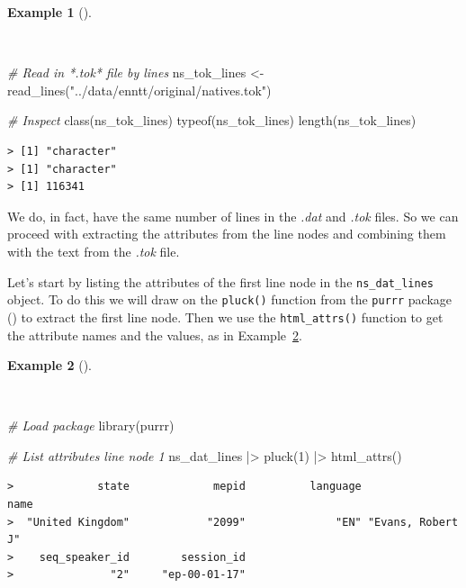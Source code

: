 \documentclass[
  letterpaper,
  DIV=11,
  numbers=noendperiod]{scrreprt}
\newenvironment{Shaded}{\begin{snugshade}}{\end{snugshade}}
\newcommand{\CommentTok}[1]{\textcolor[rgb]{0.00,0.00,0.00}{\textit{#1}}}
\newcommand{\DecValTok}[1]{\textcolor[rgb]{0.00,0.00,0.00}{#1}}
\newcommand{\FunctionTok}[1]{\textcolor[rgb]{0.00,0.00,0.00}{#1}}
\newcommand{\NormalTok}[1]{\textcolor[rgb]{0.00,0.00,0.00}{#1}}
\newcommand{\OtherTok}[1]{\textcolor[rgb]{0.00,0.00,0.00}{#1}}
\newcommand{\SpecialCharTok}[1]{\textcolor[rgb]{0.00,0.00,0.00}{#1}}
\newcommand{\StringTok}[1]{\textcolor[rgb]{0.00,0.00,0.00}{#1}}
\theoremstyle{definition}
\newtheorem{example}{Example}[chapter]
\theoremstyle{remark}
\begin{document}
\begin{example}[]\protect\hypertarget{exm-cd-enntt-read-lines}{}\label{exm-cd-enntt-read-lines}

~

\begin{Shaded}
\begin{Highlighting}[]
\CommentTok{\# Read in *.tok* file by lines}
\NormalTok{ns\_tok\_lines }\OtherTok{\textless{}{-}}
  \FunctionTok{read\_lines}\NormalTok{(}\StringTok{"../data/enntt/original/natives.tok"}\NormalTok{)}

\CommentTok{\# Inspect}
\FunctionTok{class}\NormalTok{(ns\_tok\_lines)}
\FunctionTok{typeof}\NormalTok{(ns\_tok\_lines)}
\FunctionTok{length}\NormalTok{(ns\_tok\_lines)}
\end{Highlighting}
\end{Shaded}

\begin{verbatim}
> [1] "character"
> [1] "character"
> [1] 116341
\end{verbatim}

\end{example}

We do, in fact, have the same number of lines in the \emph{.dat} and
\emph{.tok} files. So we can proceed with extracting the attributes from
the line nodes and combining them with the text from the \emph{.tok}
file.

Let's start by listing the attributes of the first line node in the
\texttt{ns\_dat\_lines} object. To do this we will draw on the
\texttt{pluck()} function from the \texttt{purrr} package
() to extract the first
line node. Then we use the \texttt{html\_attrs()} function to get the
attribute names and the values, as in
Example~\ref{exm-cd-enntt-list-attributes}.

\begin{example}[]\protect\hypertarget{exm-cd-enntt-list-attributes}{}\label{exm-cd-enntt-list-attributes}

~

\begin{Shaded}
\begin{Highlighting}[]
\CommentTok{\# Load package}
\FunctionTok{library}\NormalTok{(purrr)}

\CommentTok{\# List attributes line node 1}
\NormalTok{ns\_dat\_lines }\SpecialCharTok{|\textgreater{}}
  \FunctionTok{pluck}\NormalTok{(}\DecValTok{1}\NormalTok{) }\SpecialCharTok{|\textgreater{}}
  \FunctionTok{html\_attrs}\NormalTok{()}
\end{Highlighting}
\end{Shaded}

\begin{verbatim}
>             state             mepid          language              name 
>  "United Kingdom"            "2099"              "EN" "Evans, Robert J" 
>    seq_speaker_id        session_id 
>               "2"     "ep-00-01-17"
\end{verbatim}

\end{example}
\end{document}
